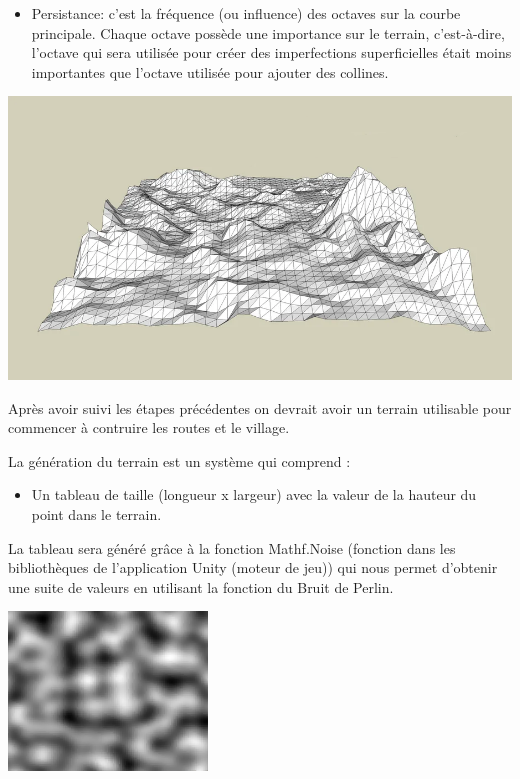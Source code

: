 \begin{itemize}
\item Persistance: c'est la fréquence (ou influence) des octaves sur la courbe principale. Chaque octave possède une importance sur le terrain, c'est-à-dire, l'octave qui sera utilisée pour 
créer des imperfections superficielles était moins importantes que l'octave utilisée pour ajouter des collines. 

\end{itemize}

\begin{center}
    \centering
    \includegraphics[height = 3 cm]{images/terrain3d.png}\\
\end{center}

Après avoir suivi les étapes précédentes on devrait avoir un terrain utilisable pour commencer à contruire les routes et le village.


La génération du terrain est un système qui comprend : 

\begin{itemize}
  \item Un tableau de taille (longueur x largeur) avec la valeur de la hauteur du point dans le terrain.
\end{itemize}

La tableau sera généré grâce à la fonction Mathf.Noise (fonction dans les bibliothèques de l'application Unity (moteur de jeu)) qui nous permet d'obtenir une suite de valeurs en utilisant la fonction du Bruit de Perlin.

\begin{center}
  \includegraphics[width = 200px]{images/bruit_perlin_unity.png}
\end{center}

